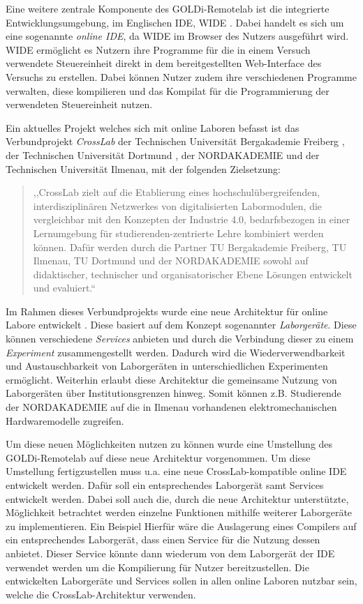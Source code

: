 Eine weitere zentrale Komponente des GOLDi-Remotelab ist die integrierte Entwicklungsumgebung, im Englischen \ac{IDE}, \ac{WIDE} \cite{henke_hidden_2021}. Dabei handelt es sich um eine sogenannte \textit{online IDE}, da WIDE im Browser des Nutzers ausgeführt wird. WIDE ermöglicht es Nutzern ihre Programme für die in einem Versuch verwendete Steuereinheit direkt in dem bereitgestellten Web-Interface des Versuchs zu erstellen. Dabei können Nutzer zudem ihre verschiedenen Programme verwalten, diese kompilieren und das Kompilat für die Programmierung der verwendeten Steuereinheit nutzen.

Ein aktuelles Projekt welches sich mit online Laboren befasst ist das Verbundprojekt \textit{CrossLab} \cite{aubel_adaptable_2022} der Technischen Universität Bergakademie Freiberg \cite{noauthor_tu-freiberg_nodate}, der Technischen Universität Dortmund \cite{dortmund_tu-dortmund_nodate}, der NORDAKADEMIE \cite{noauthor_nordakademie_nodate} und der Technischen Universität Ilmenau, mit der folgenden Zielsetzung:

\begin{quote}
    ,,CrossLab zielt auf die Etablierung eines hochschulübergreifenden, interdisziplinären Netzwerkes von digitalisierten Labormodulen, die vergleichbar mit den Konzepten der Industrie 4.0, bedarfsbezogen in einer Lernumgebung für studierenden-zentrierte Lehre kombiniert werden können. Dafür werden durch die Partner TU Bergakademie Freiberg, TU Ilmenau, TU Dortmund und der NORDAKADEMIE sowohl auf didaktischer, technischer und organisatorischer Ebene Lösungen entwickelt und evaluiert.`` \cite{noauthor_crosslab_nodate}
\end{quote}

Im Rahmen dieses Verbundprojekts wurde eine neue Architektur für online Labore entwickelt \cite{nau_new_2022}. Diese basiert auf dem Konzept sogenannter \textit{Laborgeräte}. Diese können verschiedene \textit{Services} anbieten und durch die Verbindung dieser zu einem \textit{Experiment} zusammengestellt werden. Dadurch wird die Wiederverwendbarkeit und Austauschbarkeit von Laborgeräten in unterschiedlichen Experimenten ermöglicht. Weiterhin erlaubt diese Architektur die gemeinsame Nutzung von Laborgeräten über Institutionsgrenzen hinweg. Somit können z.B. Studierende der NORDAKADEMIE auf die in Ilmenau vorhandenen elektromechanischen Hardwaremodelle zugreifen.

Um diese neuen Möglichkeiten nutzen zu können wurde eine Umstellung des GOLDi-Remotelab auf diese neue Architektur vorgenommen. Um diese Umstellung fertigzustellen muss u.a. eine neue CrossLab-kompatible online IDE entwickelt werden. Dafür soll ein entsprechendes Laborgerät samt Services entwickelt werden. Dabei soll auch die, durch die neue Architektur unterstützte, Möglichkeit betrachtet werden einzelne Funktionen mithilfe weiterer Laborgeräte zu implementieren. Ein Beispiel Hierfür wäre die Auslagerung eines Compilers auf ein entsprechendes Laborgerät, dass einen Service für die Nutzung dessen anbietet. Dieser Service könnte dann wiederum von dem Laborgerät der IDE verwendet werden um die Kompilierung für Nutzer bereitzustellen. Die entwickelten Laborgeräte und Services sollen in allen online Laboren nutzbar sein, welche die CrossLab-Architektur verwenden.

